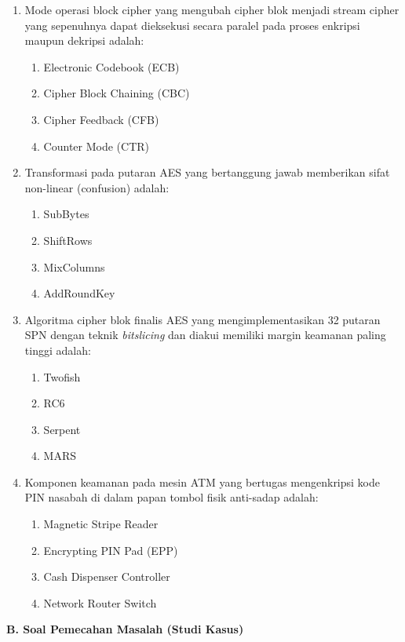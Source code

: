 \documentclass[main.tex]{subfiles}
\begin{document}
\begin{asesmen}
\begin{enumerate}
  \item Mode operasi block cipher yang mengubah cipher blok menjadi stream cipher yang sepenuhnya dapat dieksekusi secara paralel pada proses enkripsi maupun dekripsi adalah:
  \begin{enumerate}
    \item Electronic Codebook (ECB)
    \item Cipher Block Chaining (CBC)
    \item Cipher Feedback (CFB)
    \item Counter Mode (CTR)
  \end{enumerate}

  \item Transformasi pada putaran AES yang bertanggung jawab memberikan sifat non-linear (confusion) adalah:
  \begin{enumerate}
    \item SubBytes
    \item ShiftRows
    \item MixColumns
    \item AddRoundKey
  \end{enumerate}

  \item Algoritma cipher blok finalis AES yang mengimplementasikan 32 putaran SPN dengan teknik \textit{bitslicing} dan diakui memiliki margin keamanan paling tinggi adalah:
  \begin{enumerate}
    \item Twofish
    \item RC6
    \item Serpent
    \item MARS
  \end{enumerate}
  \item Komponen keamanan pada mesin ATM yang bertugas mengenkripsi kode PIN nasabah di dalam papan tombol fisik anti-sadap adalah:
  \begin{enumerate}
    \item Magnetic Stripe Reader
    \item Encrypting PIN Pad (EPP)
    \item Cash Dispenser Controller
    \item Network Router Switch
  \end{enumerate}
\end{enumerate}

\textbf{B. Soal Pemecahan Masalah (Studi Kasus)}


\end{asesmen}
\end{document}
